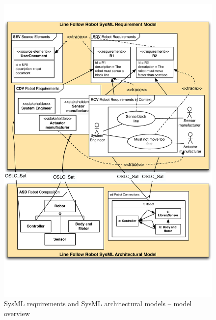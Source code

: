 \begin{description}
\begin{figure}
	\centering
	\includegraphics[scale=0.7]{figures/RE_2}
\caption{SysML requirements and SysML architectural models -- model overview}
\label{fig:re-multisysml}
\end{figure}
\end{description}

%
%

%
